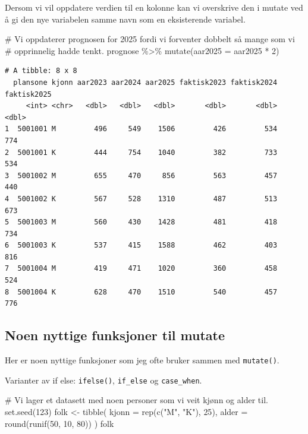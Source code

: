 \documentclass[
  letterpaper,
  DIV=11,
  numbers=noendperiod]{scrreprt}
\newenvironment{Shaded}{\begin{snugshade}}{\end{snugshade}}
\newcommand{\AttributeTok}[1]{\textcolor[rgb]{0.40,0.45,0.13}{#1}}
\newcommand{\CommentTok}[1]{\textcolor[rgb]{0.37,0.37,0.37}{#1}}
\newcommand{\DecValTok}[1]{\textcolor[rgb]{0.68,0.00,0.00}{#1}}
\newcommand{\FunctionTok}[1]{\textcolor[rgb]{0.28,0.35,0.67}{#1}}
\newcommand{\NormalTok}[1]{\textcolor[rgb]{0.00,0.23,0.31}{#1}}
\newcommand{\OtherTok}[1]{\textcolor[rgb]{0.00,0.23,0.31}{#1}}
\newcommand{\SpecialCharTok}[1]{\textcolor[rgb]{0.37,0.37,0.37}{#1}}
\newcommand{\StringTok}[1]{\textcolor[rgb]{0.13,0.47,0.30}{#1}}
\begin{document}
Dersom vi vil oppdatere verdien til en kolonne kan vi overskrive den i
mutate ved å gi den nye variabelen samme navn som en eksisterende
variabel.

\begin{Shaded}
\begin{Highlighting}[]
\CommentTok{\# Vi oppdaterer prognosen for 2025 fordi vi forventer dobbelt så mange som vi }
\CommentTok{\# opprinnelig hadde tenkt.}
\NormalTok{prognose }\SpecialCharTok{\%\textgreater{}\%} 
  \FunctionTok{mutate}\NormalTok{(}\AttributeTok{aar2025 =}\NormalTok{ aar2025 }\SpecialCharTok{*} \DecValTok{2}\NormalTok{)}
\end{Highlighting}
\end{Shaded}

\begin{verbatim}
# A tibble: 8 x 8
  plansone kjonn aar2023 aar2024 aar2025 faktisk2023 faktisk2024 faktisk2025
     <int> <chr>   <dbl>   <dbl>   <dbl>       <dbl>       <dbl>       <dbl>
1  5001001 M         496     549    1506         426         534         774
2  5001001 K         444     754    1040         382         733         534
3  5001002 M         655     470     856         563         457         440
4  5001002 K         567     528    1310         487         513         673
5  5001003 M         560     430    1428         481         418         734
6  5001003 K         537     415    1588         462         403         816
7  5001004 M         419     471    1020         360         458         524
8  5001004 K         628     470    1510         540         457         776
\end{verbatim}

\hypertarget{noen-nyttige-funksjoner-til-mutate}{%
\subsection{Noen nyttige funksjoner til
mutate}\label{noen-nyttige-funksjoner-til-mutate}}

Her er noen nyttige funksjoner som jeg ofte bruker sammen med
\texttt{mutate()}.

Varianter av if else: \texttt{ifelse()}, \texttt{if\_else} og
\texttt{case\_when}.

\begin{Shaded}
\begin{Highlighting}[]
\CommentTok{\# Vi lager et datasett med noen personer som vi veit kjønn og alder til.}
\FunctionTok{set.seed}\NormalTok{(}\DecValTok{123}\NormalTok{)}
\NormalTok{folk }\OtherTok{\textless{}{-}} \FunctionTok{tibble}\NormalTok{(}
  \AttributeTok{kjonn =} \FunctionTok{rep}\NormalTok{(}\FunctionTok{c}\NormalTok{(}\StringTok{"M"}\NormalTok{, }\StringTok{"K"}\NormalTok{), }\DecValTok{25}\NormalTok{),}
  \AttributeTok{alder =} \FunctionTok{round}\NormalTok{(}\FunctionTok{runif}\NormalTok{(}\DecValTok{50}\NormalTok{, }\DecValTok{10}\NormalTok{, }\DecValTok{80}\NormalTok{))}
\NormalTok{)}
\NormalTok{folk}
\end{Highlighting}
\end{Shaded}
\end{document}
